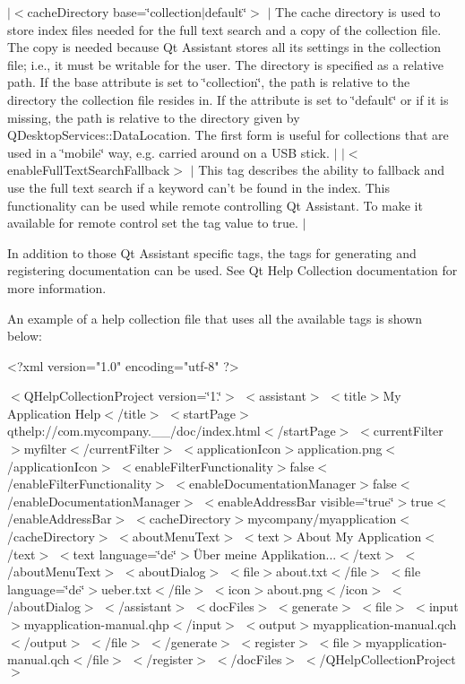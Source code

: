 $|$$<$cache\-Directory base=\char`\"{}collection$|$default\char`\"{}$>$ $|$ The cache directory is used to store index files needed for the full text search and a copy of the collection file. The copy is needed because Qt Assistant stores all its settings in the collection file; i.\-e., it must be writable for the user. The directory is specified as a relative path. If the base attribute is set to \char`\"{}collection\char`\"{}, the path is relative to the directory the collection file resides in. If the attribute is set to \char`\"{}default\char`\"{} or if it is missing, the path is relative to the directory given by Q\-Desktop\-Services\-::\-Data\-Location. The first form is useful for collections that are used in a \char`\"{}mobile\char`\"{} way, e.\-g. carried around on a U\-S\-B stick. $|$ $|$$<$enable\-Full\-Text\-Search\-Fallback$>$ $|$ This tag describes the ability to fallback and use the full text search if a keyword can't be found in the index. This functionality can be used while remote controlling Qt Assistant. To make it available for remote control set the tag value to true. $|$

In addition to those Qt Assistant specific tags, the tags for generating and registering documentation can be used. See Qt Help Collection documentation for more information.

An example of a help collection file that uses all the available tags is shown below\-: \begin{DoxyVerb}  <?xml version="1.0" encoding="utf-8" ?>
\end{DoxyVerb}
 $<$\-Q\-Help\-Collection\-Project version=\char`\"{}1.\char`\"{}$>$ $<$assistant$>$ $<$title$>$My Application Help$<$/title$>$ $<$start\-Page$>$qthelp\-://com.mycompany.\-\_\-\_/doc/index.html$<$/start\-Page$>$ $<$current\-Filter$>$myfilter$<$/current\-Filter$>$ $<$application\-Icon$>$application.\-png$<$/application\-Icon$>$ $<$enable\-Filter\-Functionality$>$false$<$/enable\-Filter\-Functionality$>$ $<$enable\-Documentation\-Manager$>$false$<$/enable\-Documentation\-Manager$>$ $<$enable\-Address\-Bar visible=\char`\"{}true\char`\"{}$>$true$<$/enable\-Address\-Bar$>$ $<$cache\-Directory$>$mycompany/myapplication$<$/cache\-Directory$>$ $<$about\-Menu\-Text$>$ $<$text$>$About My Application$<$/text$>$ $<$text language=\char`\"{}de\char`\"{}$>$Über meine Applikation...$<$/text$>$ $<$/about\-Menu\-Text$>$ $<$about\-Dialog$>$ $<$file$>$about.\-txt$<$/file$>$ $<$file language=\char`\"{}de\char`\"{}$>$ueber.\-txt$<$/file$>$ $<$icon$>$about.\-png$<$/icon$>$ $<$/about\-Dialog$>$ $<$/assistant$>$ $<$doc\-Files$>$ $<$generate$>$ $<$file$>$ $<$input$>$myapplication-\/manual.\-qhp$<$/input$>$ $<$output$>$myapplication-\/manual.\-qch$<$/output$>$ $<$/file$>$ $<$/generate$>$ $<$register$>$ $<$file$>$myapplication-\/manual.\-qch$<$/file$>$ $<$/register$>$ $<$/doc\-Files$>$ $<$/\-Q\-Help\-Collection\-Project$>$

